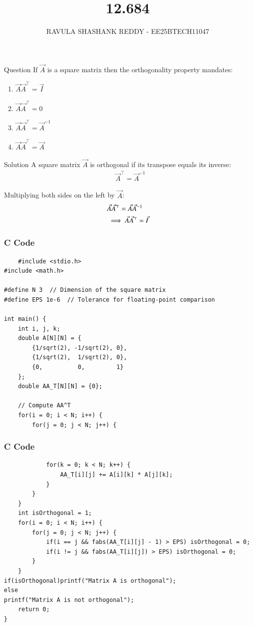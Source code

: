 \documentclass{beamer}
\title %
{12.684}
\author %
{RAVULA SHASHANK REDDY - EE25BTECH11047}
\begin{document}
	
	
	\frame{\titlepage}
	\begin{frame}{Question}
    If $\vec{A}$ is a square matrix then the orthogonality property mandates:

\begin{enumerate}[label=\alph*)]
\item $\vec{A}\vec{A}^\top = \vec{I}$
\item $\vec{A}\vec{A}^\top = 0$
\item $\vec{A}\vec{A}^\top = \vec{A}^{-1}$
\item $\vec{A}\vec{A}^\top = \vec{A}$
\end{enumerate}
\end{frame}
\begin{frame}{Solution}
    A square matrix $\vec{A}$ is orthogonal if its transpose equals its inverse: 
\begin{align}
& \vec{A}^\top = \vec{A}^{-1} 
\end{align}

Multiplying both sides on the left by $\vec{A}$:
\begin{align}
& \vec{A} \vec{A}^\top = \vec{A} \vec{A}^{-1} \notag \\
& \implies \vec{A}\vec{A}^\top = \vec{I}
\end{align}
\end{frame}
\begin{frame}[fragile]
\frametitle{C Code}
\begin{lstlisting}
    #include <stdio.h>
#include <math.h>

#define N 3  // Dimension of the square matrix
#define EPS 1e-6  // Tolerance for floating-point comparison

int main() {
    int i, j, k;
    double A[N][N] = {
        {1/sqrt(2), -1/sqrt(2), 0},
        {1/sqrt(2),  1/sqrt(2), 0},
        {0,          0,         1}
    };
    double AA_T[N][N] = {0};

    // Compute AA^T
    for(i = 0; i < N; i++) {
        for(j = 0; j < N; j++) {
        \end{lstlisting}
        \end{frame}
\begin{frame}[fragile]
\frametitle{C Code}
\begin{lstlisting}
            for(k = 0; k < N; k++) {
                AA_T[i][j] += A[i][k] * A[j][k]; 
            }
        }
    }
    int isOrthogonal = 1;
    for(i = 0; i < N; i++) {
        for(j = 0; j < N; j++) {
            if(i == j && fabs(AA_T[i][j] - 1) > EPS) isOrthogonal = 0;
            if(i != j && fabs(AA_T[i][j]) > EPS) isOrthogonal = 0;
        }
    }
if(isOrthogonal)printf("Matrix A is orthogonal");
else
printf("Matrix A is not orthogonal");
    return 0;
}
\end{lstlisting}
\end{frame}
\end{document}
